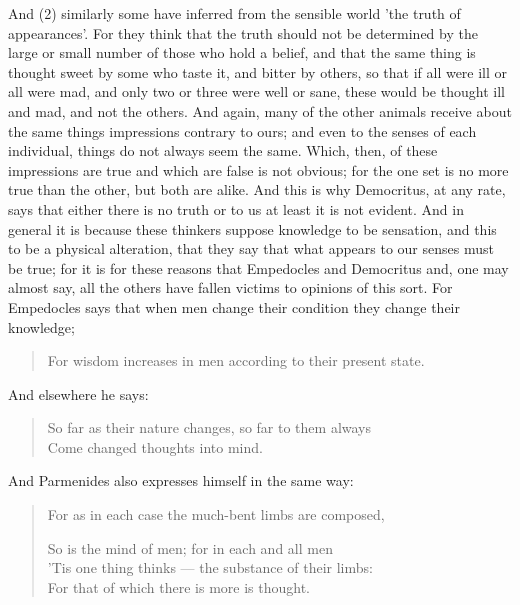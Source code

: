 And (2) similarly some have inferred from the sensible world 'the truth of appearances'. For they think that the truth should not be determined by the large or small number of those who hold a belief, and that the same thing is thought sweet by some who taste it, and bitter by others, so that if all were ill or all were mad, and only two or three were well or sane, these would be thought ill and mad, and not the others. And again, many of the other animals receive about the same things impressions contrary to ours; and even to the senses of each individual, things do not always seem the same. Which, then, of these impressions are true and which are false is not obvious; for the one set is no more true than the other, but both are alike. And this is why Democritus, at any rate, says that either there is no truth or to us at least it is not evident. And in general it is because these thinkers suppose knowledge to be sensation, and this to be a physical alteration, that they say that what appears to our senses must be true; for it is for these reasons that Empedocles and Democritus and, one may almost say, all the others have fallen victims to opinions of this sort. For Empedocles says that when men change their condition they change their knowledge;

\begin{quote}

For wisdom increases in men according to their present state.
\end{quote}

And elsewhere he says:

\begin{quote}

So far as their nature changes, so far to them always \\
Come changed thoughts into mind.
\end{quote}

And Parmenides also expresses himself in the same way:

\begin{quote}

For as in each case the much-bent limbs are composed,

So is the mind of men; for in each and all men\\
'Tis one thing thinks — the substance of their limbs:\\
For that of which there is more is thought.
\end{quote}

